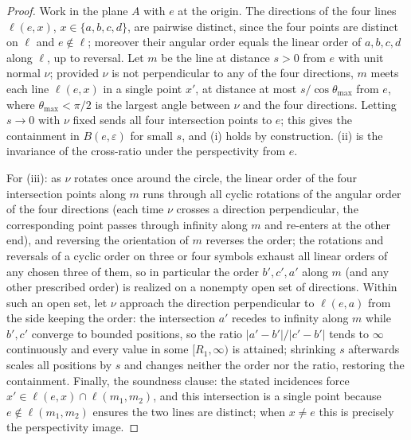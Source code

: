 \documentclass[11pt]{amsart}
\theoremstyle{definition}
\begin{document}
\begin{proof}
Work in the plane $A$ with $e$ at the origin. The directions of the four
lines $\ell(e,x)$, $x\in\{a,b,c,d\}$, are pairwise distinct, since the four
points are distinct on $\ell$ and $e\notin\ell$; moreover their angular order
equals the linear order of $a,b,c,d$ along $\ell$, up to reversal. Let $m$ be
the line at distance $s>0$ from $e$ with unit normal $\nu$; provided $\nu$ is
not perpendicular to any of the four directions, $m$ meets each line
$\ell(e,x)$ in a single point $x'$, at distance at most $s/\cos\theta_{\max}$
from $e$, where $\theta_{\max}<\pi/2$ is the largest angle between $\nu$ and
the four directions. Letting $s\to0$ with $\nu$ fixed sends all four
intersection points to $e$; this gives the containment in $B(e,\varepsilon)$
for small $s$, and (i) holds by construction. (ii) is the invariance of the
cross-ratio under the perspectivity from $e$.

For (iii): as $\nu$ rotates once around the circle, the linear order of the
four intersection points along $m$ runs through all cyclic rotations of the
angular order of the four directions (each time $\nu$ crosses a direction
perpendicular, the corresponding point passes through infinity along $m$ and
re-enters at the other end), and reversing the orientation of $m$ reverses the
order; the rotations and reversals of a cyclic order on three or four symbols
exhaust all linear orders of any chosen three of them, so in particular the
order $b',c',a'$ along $m$ (and any other prescribed order) is realized on a
nonempty open set of directions. Within such an open set, let $\nu$ approach
the direction perpendicular to $\ell(e,a)$ from the side keeping the order:
the intersection $a'$ recedes to infinity along $m$ while $b',c'$ converge to
bounded positions, so the ratio $|a'-b'|/|c'-b'|$ tends to $\infty$
continuously and every value in some $[R_1,\infty)$ is attained; shrinking $s$
afterwards scales all positions by $s$ and changes neither the order nor the
ratio, restoring the containment. Finally, the soundness clause: the stated
incidences force $x'\in\ell(e,x)\cap\ell(m_1,m_2)$, and this intersection is a
single point because $e\notin\ell(m_1,m_2)$ ensures the two lines are
distinct; when $x\ne e$ this is precisely the perspectivity image.
\end{proof}
\end{document}
